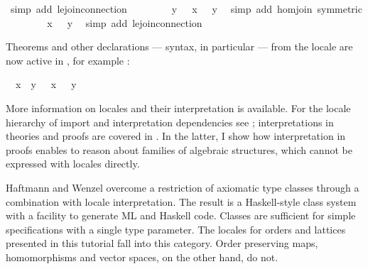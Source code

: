 \begin{isabellebody}
\ {\isacharparenleft}simp\ add{\isacharcolon}\ le{\isachardot}join{\isacharunderscore}connection{\isacharparenright}\isanewline
\ \ \ \ \isamarkupfalse%
\ \isamarkupfalse%
\ {\isachardoublequoteopen}{\isasymphi}\ y\ {\isacharequal}\ {\isacharparenleft}{\isasymphi}\ x\ {\isasymsqunion}{\isacharprime}\ {\isasymphi}\ y{\isacharparenright}{\isachardoublequoteclose}\ \isamarkupfalse%
\ {\isacharparenleft}simp\ add{\isacharcolon}\ hom{\isacharunderscore}join\ {\isacharbrackleft}symmetric{\isacharbrackright}{\isacharparenright}\isanewline
\ \ \ \ \isamarkupfalse%
\ \isamarkupfalse%
\ {\isachardoublequoteopen}{\isasymphi}\ x\ {\isasympreceq}\ {\isasymphi}\ y{\isachardoublequoteclose}\ \isamarkupfalse%
\ {\isacharparenleft}simp\ add{\isacharcolon}\ le{\isacharprime}{\isachardot}join{\isacharunderscore}connection{\isacharparenright}\isanewline
\ \ \isamarkupfalse%
%
\endisatagproof
{\isafoldproof}%
%
\isadelimproof
%
\endisadelimproof
%
\begin{isamarkuptext}%
Theorems and other declarations --- syntax, in particular --- from
  the locale  are now active in , for example
  :
  \begin{isabelle}%
\ \ {\isacharquery}x\ {\isasymsqsubseteq}\ {\isacharquery}y\ {\isasymLongrightarrow}\ {\isasymphi}\ {\isacharquery}x\ {\isasympreceq}\ {\isasymphi}\ {\isacharquery}y%
\end{isabelle}%
\end{isamarkuptext}%
\isamarkuptrue%
%
\isamarkuptrue%
%
\begin{isamarkuptext}%
More information on locales and their interpretation is
  available.  For the locale hierarchy of import and interpretation
  dependencies see \cite{Ballarin2006a}; interpretations in theories
  and proofs are covered in \cite{Ballarin2006b}.  In the latter, I
  show how interpretation in proofs enables to reason about families
  of algebraic structures, which cannot be expressed with locales
  directly.

  Haftmann and Wenzel \cite{HaftmannWenzel2007} overcome a restriction
  of axiomatic type classes through a combination with locale
  interpretation.  The result is a Haskell-style class system with a
  facility to generate ML and Haskell code.  Classes are sufficient for
  simple specifications with a single type parameter.  The locales for
  orders and lattices presented in this tutorial fall into this
  category.  Order preserving maps, homomorphisms and vector spaces,
  on the other hand, do not.


\end{isamarkuptext}
\end{isabellebody}
